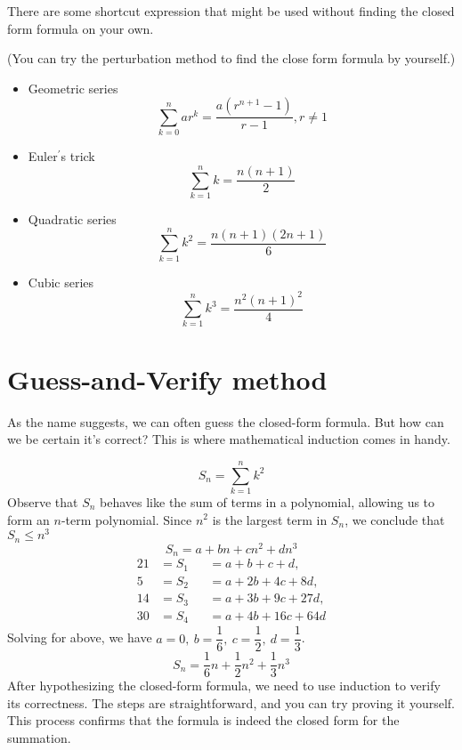 \newpage
There are some shortcut expression that might be used without finding the closed form formula on your own.
\begin{proposition}
	(You can try the perturbation method to find the close form formula by yourself.)
	
	\begin{itemize}
		\item Geometric series
		\[
		\sum_{k = 0}^n ar^k = \dfrac{a(r^{n+1} - 1)}{r - 1}, r \neq 1
		\]
		\item  Euler\(^{\prime}\)s trick
		\[
		\sum_{k = 1}^n k = \dfrac{n(n+1)}{2}
		\]
		\item Quadratic series
		\[
			\sum_{k = 1}^n k^2 = \dfrac{n(n + 1)(2n + 1)}{6}
		\]
		\item Cubic series
		\[
			\sum_{k = 1}^n k^3 = \dfrac{n^2(n + 1)^2}{4}
		\]
	\end{itemize}
\end{proposition}

\section{Guess-and-Verify method}
As the name suggests, we can often guess the closed-form formula. But how can we be certain it's correct? This is where mathematical induction comes in handy.
\begin{eg}
	\[
		S_n = \sum_{k = 1}^n k^2
	\]
	Observe that \(S_n\) behaves like the sum of terms in a polynomial, allowing us to form an \(n\)-term polynomial. Since \(n^2\) is the largest term in \(S_n\), we conclude that \(S_n \leq  n^3\) 
	\[
		S_n = a + bn + cn^2 + dn^3
	\]
	\begin{alignat*}{2}
		1 &= S_1 &&= a + b + c + d,\\
		5 &= S_2 &&= a + 2b + 4c + 8d,\\
		14 &= S_3 &&= a + 3b + 9c + 27d,\\
		30 &= S_4 &&= a + 4b + 16c + 64d
	\end{alignat*}
	Solving for above, we have \(a = 0,\ b = \dfrac{1}{6},\ c = \dfrac{1}{2},\ d = \dfrac{1}{3}\).
	\[
		S_n = \dfrac{1}{6}n + \dfrac{1}{2}n^2 + \dfrac{1}{3}n^3
	\]
	After hypothesizing the closed-form formula, we need to use induction to verify its correctness. The steps are straightforward, and you can try proving it yourself. This process confirms that the formula is indeed the closed form for the summation.
\end{eg}

\newpage
